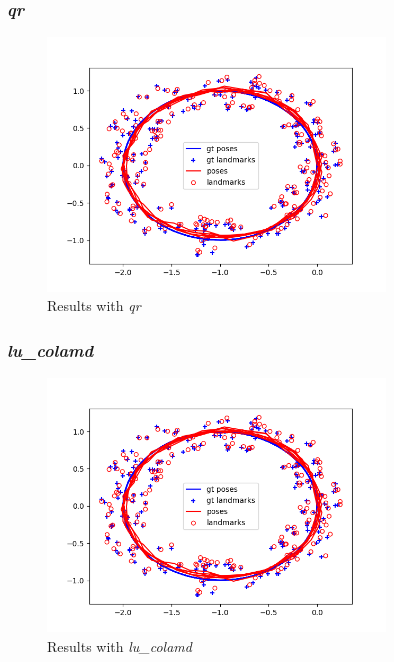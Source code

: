 \documentclass[12pt, a4paper]{article}
\begin{document}
\subsubsection{\textit{qr}}
\begin{figure}[H]
  \centering
  \includegraphics[width=0.8\textwidth]{./results/linear/qr_2d_linear_loop_map.png}
  \caption{Results with \textit{qr}}
\end{figure}
\subsubsection{\textit{lu\_colamd}}
\begin{figure}[H]
  \centering
  \includegraphics[width=0.8\textwidth]{./results/linear/lu_colamd_2d_linear_loop_map.png}
  \caption{Results with \textit{lu\_colamd}}
\end{figure}
\end{document}
